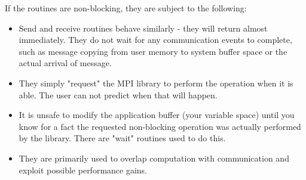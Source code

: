 If the routines are non-blocking, they are subject to the following:
\begin{itemize}
\item Send and receive routines behave similarly - they will return almost immediately. They do not wait for any communication events to complete, such as message copying from user memory to system buffer space or the actual arrival of message. 
\item They simply "request" the MPI library to perform the operation when it is able. The user can not predict when that will happen. 
\item It is unsafe to modify the application buffer (your variable space) until you know for a fact the requested non-blocking operation was actually performed by the library. There are "wait" routines used to do this. 
\item They are primarily used to overlap computation with communication and exploit possible performance gains.
\end{itemize}

